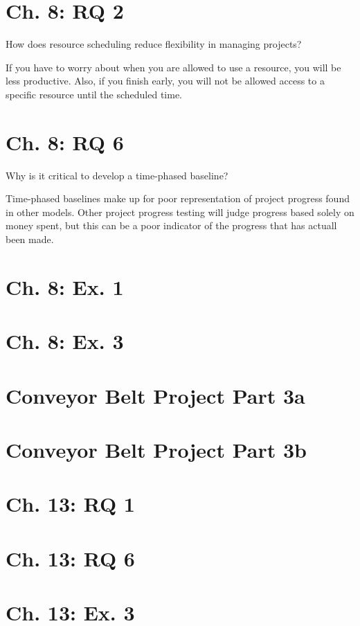 \documentclass[12pt, letter]{extarticle}
\begin{document}
\section{Ch. 8: RQ 2}
How does resource scheduling reduce flexibility in managing projects?

If you have to worry about when you are allowed to use a resource, you will be less productive.
Also, if you finish early, you will not be allowed access to a specific resource until the scheduled time.

\section{Ch. 8: RQ 6}
Why is it critical to develop a time-phased baseline?

Time-phased baselines make up for poor representation of project progress found in other models.
Other project progress testing will judge progress based solely on money spent, but this can be a poor indicator of the progress that has actuall been made.

\section{Ch. 8: Ex. 1}
\section{Ch. 8: Ex. 3}
\section{Conveyor Belt Project Part 3a}
\section{Conveyor Belt Project Part 3b}
\section{Ch. 13: RQ 1}
\section{Ch. 13: RQ 6}
\section{Ch. 13: Ex. 3}
\end{document}
